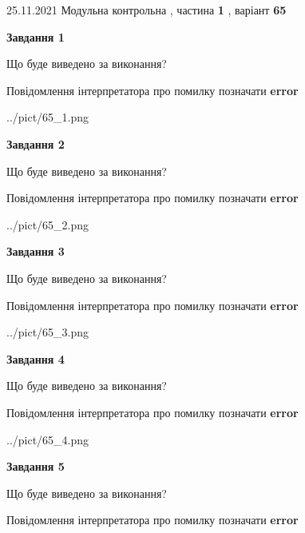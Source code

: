 \documentclass[10pt, ukrainian]{article}
\begin{document}
{25.11.2021 Модульна контрольна , частина \textbf { 1 }, варіант  \No \textbf { 65 }\par}
{
\begin {large}

{\begin {center}\textbf{Завдання 1}\end {center}}\par
Що буде виведено за виконання? \par
Повідомлення інтерпретатора про помилку позначати \textbf{error}

\begin{center}
	{../pict/65_1.png}
\end{center}
\newpage

{\begin {center}\textbf{Завдання 2}\end {center}}\par
Що буде виведено за виконання? \par
Повідомлення інтерпретатора про помилку позначати \textbf{error}

\begin{center}
	{../pict/65_2.png}
\end{center}
\newpage

{\begin {center}\textbf{Завдання 3}\end {center}}\par
Що буде виведено за виконання? \par
Повідомлення інтерпретатора про помилку позначати \textbf{error}

\begin{center}
	{../pict/65_3.png}
\end{center}
\newpage

{\begin {center}\textbf{Завдання 4}\end {center}}\par
Що буде виведено за виконання? \par
Повідомлення інтерпретатора про помилку позначати \textbf{error}

\begin{center}
	{../pict/65_4.png}
\end{center}
\newpage

{\begin {center}\textbf{Завдання 5}\end {center}}\par
Що буде виведено за виконання? \par
Повідомлення інтерпретатора про помилку позначати \textbf{error}


\end{large}}
\end{document}
